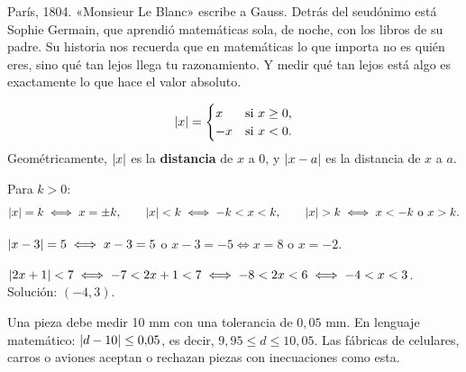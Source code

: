 \documentclass[11pt]{article}
\begin{document}
\begin{hilo}
París, 1804. «Monsieur Le Blanc» escribe a Gauss. Detrás del seudónimo está Sophie
Germain, que aprendió matemáticas sola, de noche, con los libros de su padre. Su
historia nos recuerda que en matemáticas lo que importa no es quién eres, sino qué
tan lejos llega tu razonamiento. Y medir qué tan lejos está algo es exactamente
lo que hace el valor absoluto.
\end{hilo}

\begin{definicion}
\[
  \lvert x\rvert = \begin{cases} x & \text{si } x \ge 0,\\ -x & \text{si } x < 0. \end{cases}
\]
Geométricamente, $\lvert x\rvert$ es la \textbf{distancia} de $x$ a $0$, y $\lvert x - a\rvert$ es
la distancia de $x$ a $a$.
\end{definicion}

Para $k > 0$:
\[
  \lvert x\rvert = k \iff x = \pm k, \qquad
  \lvert x\rvert < k \iff -k < x < k, \qquad
  \lvert x\rvert > k \iff x < -k \ \text{o}\ x > k.
\]

\begin{ejemplo}
$\lvert x - 3\rvert = 5 \iff x - 3 = 5$ o $x - 3 = -5 \iff x = 8$ o $x = -2$.

$\lvert2x + 1\rvert < 7 \iff -7 < 2x + 1 < 7 \iff -8 < 2x < 6 \iff -4 < x < 3$.
Solución: $(-4, 3)$.
\end{ejemplo}

\begin{aplicacion}
Una pieza debe medir 10 mm con una tolerancia de $0{,}05$ mm. En lenguaje
matemático: $\lvert d - 10\rvert \le 0{,}05$, es decir, $9{,}95 \le d \le 10{,}05$. Las
fábricas de celulares, carros o aviones aceptan o rechazan piezas con
inecuaciones como esta.
\end{aplicacion}
\end{document}
